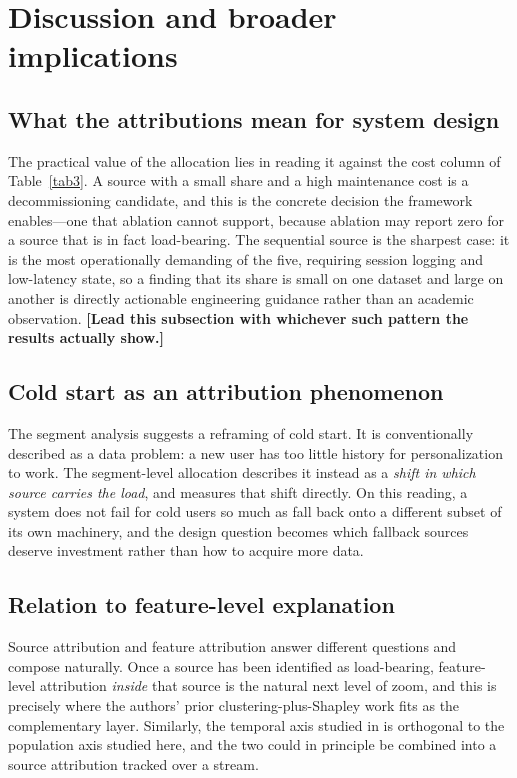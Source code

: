 \documentclass[pdflatex,sn-mathphys-num]{sn-jnl}%
\theoremstyle{thmstyleone}%
\theoremstyle{thmstyletwo}%
\theoremstyle{thmstylethree}%
\newcommand{\tbd}[1]{\textbf{[#1]}}
\begin{document}
\section{Discussion and broader implications}\label{sec5}

\subsection{What the attributions mean for system design}\label{subsec5_1}

The practical value of the allocation lies in reading it against the cost column of Table~\ref{tab3}. A source with a small share and a high maintenance cost is a decommissioning candidate, and this is the concrete decision the framework enables---one that ablation cannot support, because ablation may report zero for a source that is in fact load-bearing. The sequential source is the sharpest case: it is the most operationally demanding of the five, requiring session logging and low-latency state, so a finding that its share is small on one dataset and large on another is directly actionable engineering guidance rather than an academic observation. \tbd{Lead this subsection with whichever such pattern the results actually show.}

\subsection{Cold start as an attribution phenomenon}\label{subsec5_2}

The segment analysis suggests a reframing of cold start. It is conventionally described as a data problem: a new user has too little history for personalization to work. The segment-level allocation describes it instead as a \emph{shift in which source carries the load}, and measures that shift directly. On this reading, a system does not fail for cold users so much as fall back onto a different subset of its own machinery, and the design question becomes which fallback sources deserve investment rather than how to acquire more data.

\subsection{Relation to feature-level explanation}\label{subsec5_3}

Source attribution and feature attribution answer different questions and compose naturally. Once a source has been identified as load-bearing, feature-level attribution \emph{inside} that source is the natural next level of zoom, and this is precisely where the authors' prior clustering-plus-Shapley work \cite{louhichi2023,louhichi2025} fits as the complementary layer. Similarly, the temporal axis studied in \cite{nesmaoui2026drift} is orthogonal to the population axis studied here, and the two could in principle be combined into a source attribution tracked over a stream.
\end{document}
